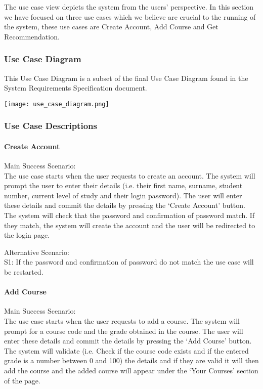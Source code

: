 \documentclass[10pt]{article}
\begin{document}
The use case view depicts the system from the users’ perspective. In this section we have focused on three use cases which we believe are crucial to the running of the system, these use cases are Create Account, Add Course and Get Recommendation.

\subsubsection{Use Case Diagram}
This Use Case Diagram is a subset of the final Use Case Diagram found in the System Requirements Specification document.
\begin{center}
\texttt{[image: use\_case\_diagram.png]}
\end{center}

\subsubsection{Use Case Descriptions}

\paragraph{ Create Account \\}

Main Success Scenario: \\
The use case starts when the user requests to create an account. The system will prompt the user to enter their details (i.e. their first name, surname, student number, current level of study and their login password). The user will enter these details and commit the details by pressing the ‘Create Account’ button. The system will check that the password and confirmation of password match. If they match, the system will create the account and the user will be redirected to the login page.

Alternative Scenario: \\
S1: If the password and confirmation of password do not match the use case will be restarted.

\paragraph{ Add Course \\}

Main Success Scenario: \\
The use case starts when the user requests to add a course. The system will prompt for a course code and the grade obtained in the course. The user will enter these details and  commit the details by pressing the ‘Add Course’ button. The system will validate (i.e. Check if the course code exists and if the entered grade is a number between 0 and 100) the details and if they are valid it will then add the course and the added course will appear under the ‘Your Courses’ section of the page.
\end{document}
